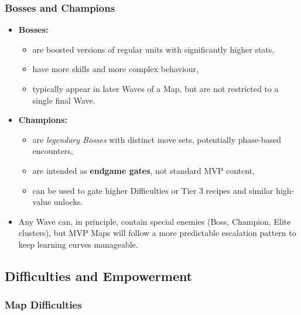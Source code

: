 \subsubsection*{Bosses and Champions}

\begin{itemize}
	\item \textbf{Bosses:}
	\begin{itemize}
		\item are boosted versions of regular units with significantly higher stats,
		\item have more skills and more complex behaviour,
		\item typically appear in later Waves of a Map, but are not restricted to a single final Wave.
	\end{itemize}
	\item \textbf{Champions:}
	\begin{itemize}
		\item are \emph{legendary Bosses} with distinct move sets, potentially phase-based encounters,
		\item are intended as \textbf{endgame gates}, not standard MVP content,
		\item can be used to gate higher Difficulties or Tier 3 recipes and similar high-value unlocks.
	\end{itemize}
	\item Any Wave can, in principle, contain special enemies (Boss, Champion, Elite clusters), 
	but MVP Maps will follow a more predictable escalation pattern to keep learning curves manageable.
\end{itemize}


\subsection{Difficulties and Empowerment}

\subsubsection*{Map Difficulties}


